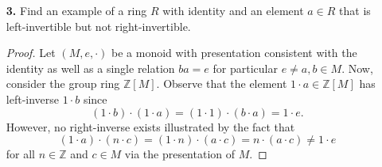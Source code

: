 \documentclass[ 12pt ]{article}
\begin{document}
\begin{enumerate}
	\item[\textbf{3.}] Find an example of a ring $R$ with identity and an element $a \in R$ that is left-invertible but not right-invertible.

		\begin{proof}
			Let $(M, e, \cdot)$ be a monoid with presentation consistent with the identity as well as a single relation $ba = e$ for particular $e \neq a, b \in M$. Now, consider the group ring $\mathbb{Z}[M]$. Observe that the element $1 \cdot a \in \mathbb{Z}[M]$ has left-inverse $1 \cdot b$ since $$(1 \cdot b) \cdot (1 \cdot a) = (1 \cdot 1) \cdot (b \cdot a) = 1 \cdot e.$$ However, no right-inverse exists illustrated by the fact that $$(1 \cdot a) \cdot (n \cdot c) = (1 \cdot n) \cdot (a \cdot c) = n \cdot (a \cdot c) \neq 1 \cdot e$$ for all $n \in \mathbb{Z}$ and $c \in M$ via the presentation of $M$.
		\end{proof}


\end{enumerate}
\end{document}
